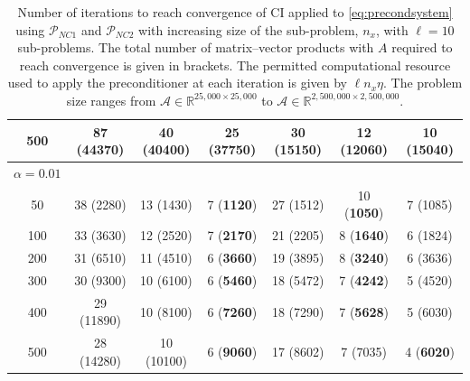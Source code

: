 \documentclass{article}
\newcommand{\resource}{\eta}
\theoremstyle{definition}
\begin{document}
{\begin{table}[]
\begin{tabular}{c|ccc|ccc}
				500 &  87	(44370)&	40	(40400)&	25	(\textbf{37750})&	30	(15150) &	12	(\textbf{12060})&	10	(15040)\\
				\hline
				$\alpha = 0.01$&&&&&&\\ \hline          
				
				50 &38	(2280)&	13	(1430) &	7	(\textbf{1120}) &	27	(1512)	&10	(\textbf{1050})	&7	(1085)\\
				100 & 33	(3630)&	12	(2520)&	7	(\textbf{2170})&	21	(2205)&	8	(\textbf{1640}) &	6	(1824) \\
				200&31	(6510)&	11	(4510)&	6	(\textbf{3660}) &	19	(3895) &	8	(\textbf{3240})&	6	(3636)\\
				300& 30	(9300) &	10	(6100) &	6	(\textbf{5460}) &	18	(5472) &	7	(\textbf{4242}) &	5	(4520)\\
				400 & 29	(11890)	&10	(8100)&	6	(\textbf{7260}) &	18	(7290) &	7	(\textbf{5628})	& 5	(6030)\\
				500 & 28	(14280)&	10	(10100) &	6	(\textbf{9060}) &	17	(8602)	&7	({7035}) &	4	(\textbf{6020})
			\end{tabular}
			
			
			
			\caption{Number of iterations to reach convergence of CI applied to \eqref{eq:precondsystem} using $\mathcal{P}_{NC1}$ and $\mathcal{P}_{NC2}$ with increasing size of the sub-problem, $n_x$, with $\ell = 10$ sub-problems. The total number of matrix--vector products with $A$ required to reach convergence is given in brackets. The permitted computational resource used to apply the preconditioner at each iteration is given by $\ell n_x  \resource$. The problem size ranges from $\mathcal{A}\in \mathbb{R}^{25,000\times 25,000}$ to $\mathcal{A}\in \mathbb{R}^{2,500,000\times 2,500,000}$.} 
			\label{tab:nx_scaling}
		\end{table}
		
		
		
}
\end{document}
